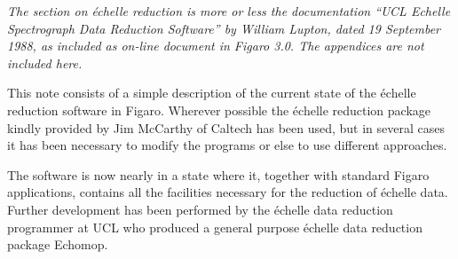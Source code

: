 %
%
%

{\em
   The section on \'echelle reduction is more or less the
   documentation ``UCL Echelle Spectrograph Data Reduction Software'' by
   William Lupton, dated 19 September 1988, as included as on-line
   document in Figaro 3.0. The appendices are not included here.
\/}

   This note consists of a simple description of the current state of
   the \'echelle reduction software in Figaro. Wherever possible
   the \'echelle reduction package kindly provided by Jim McCarthy
   of Caltech has been used, but in several cases it has been necessary
   to modify the programs or else to use different approaches.

   The software is now nearly in a state where it, together with
   standard Figaro applications, contains all the facilities necessary
   for the reduction of \'echelle data. Further development has
   been performed by the \'echelle data reduction programmer at UCL
   who produced a general purpose \'echelle data reduction package
   Echomop.

